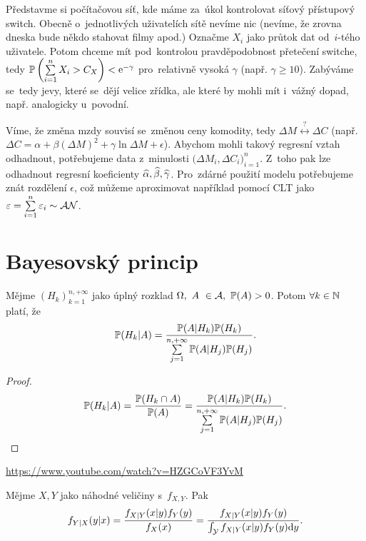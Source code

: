 \begin{example}[MEX] Představme si počítačovou síť, kde máme za~úkol kontrolovat síťový přístupový switch. Obecně o~jednotlivých uživatelích sítě nevíme nic (nevíme, že zrovna dneska bude někdo stahovat filmy apod.) Označme $X_i$ jako průtok dat od~$i$-tého uživatele. Potom chceme mít pod~kontrolou pravděpodobnost přetečení switche, tedy $\mathbb{P}\left( \sum\limits_{i=1}^{n} X_i>C_X \right)<\mathrm{e}^{-\gamma}$ pro~relativně vysoká $\gamma$ (např. $\gamma\geq 10$). Zabýváme se~tedy jevy, které se~dějí velice zřídka, ale které by mohli mít i~vážný dopad, např. analogicky u~povodní. 
\end{example}

\begin{example}[Ekonometrie]
	Víme, že změna mzdy souvisí se~změnou ceny komodity, tedy $\Delta M \stackrel{?}{\leftrightarrow}\Delta C$ (např. $\Delta C=\alpha+\beta(\Delta M)^2+\gamma\ln\Delta M+\epsilon$). Abychom mohli takový regresní vztah odhadnout, potřebujeme data z~minulosti $\big(\Delta M_i,\Delta C_i\big)_{i=1}^n$. Z~toho pak lze odhadnout regresní koeficienty $\widehat{\alpha},\widehat{\beta},\widehat{\gamma}$. Pro~zdárné použití modelu potřebujeme znát rozdělení $\epsilon$, což můžeme aproximovat například pomocí CLT jako $\varepsilon=\sum\limits_{i=1}^{n} \varepsilon_i\sim\mathcal{AN}$.
\end{example}

\chapter{Bayesovský princip}

\begin{theorem}[Bayesova] 
	Mějme $(H_k)_{k=1}^{n,+\infty}$ jako úplný rozklad $\Omega,~A~\in \mathcal{A} , ~\mathbb{P}(A)>0$. Potom $\forall k\in\mathbb{N}$ platí, že 
	\[
	\mathbb{P}(H_k|A)=\frac{\mathbb{P}(A|H_k)\mathbb{P}(H_k)}{\sum\limits_{j=1}^{n,+\infty}\mathbb{P}(A|H_j)\mathbb{P}(H_j)}.
	\]
	\begin{proof}
		$$\mathbb{P}(H_k|A)=\frac{\mathbb{P}(H_k\cap A)}{\mathbb{P}(A)}=\frac{\mathbb{P}(A|H_k)\mathbb{P}(H_k)}{\sum\limits_{j=1}^{n,+\infty}\mathbb{P}(A|H_j)\mathbb{P}(H_j)}.$$
	\end{proof}
\end{theorem}

\begin{example}[Steve]
\href{https://www.youtube.com/watch?v=HZGCoVF3YvM}{https://www.youtube.com/watch?v=HZGCoVF3YvM}
\end{example}
\begin{theorem}
	Mějme $X,Y$ jako náhodné veličiny s~$f_{X,Y}$. Pak
	$$ f_{Y|X}(y|x)=\frac{f_{X|Y}(x|y)f_Y(y)}{f_X(x)}=\frac{f_{X|Y}(x|y)f_Y(y)}{\int_{\mathcal{Y}} f_{X|Y}(x|y)f_Y(y)\mathrm{d} y}. $$
\end{theorem}

